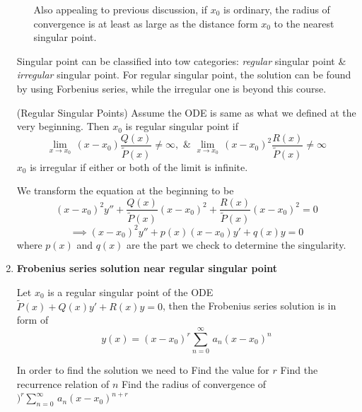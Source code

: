 \documentclass[10pt]{article}
\newcommand*\circled[1]{\tikz[baseline=(char.base)]{
            \node[shape=circle,draw,inner sep=2pt] (char) {#1};}}
\newenvironment{changemargin}[2]{%
  \begin{list}{}{%
    \setlength{\topsep}{0pt}%
    \setlength{\leftmargin}{#1}%
    \setlength{\rightmargin}{#2}%
    \setlength{\listparindent}{\parindent}%
    \setlength{\itemindent}{\parindent}%
    \setlength{\parsep}{\parskip}%
  }%
  \item[]}{\end{list}}
\begin{document}
\begin{changemargin}{-0.125in}{0in}
\begin{enumerate}
\begin{itemize}
	   	   	\smallskip
	   	   	
	   	   	Also appealing to previous discussion, if $x_0$ is ordinary, the radius of convergence is at least as large as the distance form $x_0$ to the nearest singular point.
	   	   \end{itemize}
	   	   
	   	   \medskip
	   	   
	   	   Singular point can be classified into tow categories: 
	   	   \textit{regular} singular point \& \textit{irregular} singular point. For regular singular point, the solution can be found by using Forbenius series, while the irregular one is beyond this course. 
	   	   
	   	   \begin{tcolorbox}[notitle,boxrule=0pt,colback=orange!20,colframe=blue!20] 
	   	   \begin{definition} (Regular Singular Points) Assume the ODE is same as what we defined at the very beginning. Then $x_0$ is regular singular point if
	   	   \[
	   	   \lim_{x\rightarrow x_0}\,(x-x_0)\frac{Q(x)}{\tilde{P}(x)} \neq \infty,\,\,\&\,\,\lim_{x\rightarrow x_0}\,(x-x_0)^2\frac{R(x)}{\tilde{P}(x)}\neq \infty
	   	   \] 
	   	   $x_0$ is irregular if either or both of the limit is infinite. 
	   	   
	   	   \end{definition}
	        \end{tcolorbox}
	        
	        We transform the equation at the beginning to be \[
	            (x - x_0)^2 y'' + \frac{Q(x)}{\tilde{P}(x)}(x - x_0)^2 + \frac{R(x)}{\tilde{P}(x)}(x-x_0)^2 =0
	            \]
	            \[
	            \implies (x - x_0)^2 y'' + p(x)(x - x_0)y' + q(x)y =0
	            \]
	            where $p(x)$ and $q(x)$ are the part we check to determine the singularity. 
	            
	            
	            \bigskip
	            
	            \item \textbf{Frobenius series solution near regular singular point}
	            
	            \medskip
	            
	            \begin{definition}
	            	Let $x_0$ is a regular singular point of the ODE $ \tilde{P}(x) + Q(x)y' + R(x)y = 0$, then the Frobenius series solution is in form of 
	            	\[
	            	y(x) = (x-x_0)^r\sum_{n=0}^\infty \,a_n (x-x_0)^n
	            	\]
	            \end{definition}
	            In order to find the solution we need to \circled{1} Find the value for $r$ \circled{2} Find the recurrence relation of $n$ \circled{3} Find the radius of convergence of $)^r\sum_{n=0}^\infty \,a_n (x-x_0)^{n + r}$
	            

\end{enumerate}
\end{changemargin}
\end{document}
